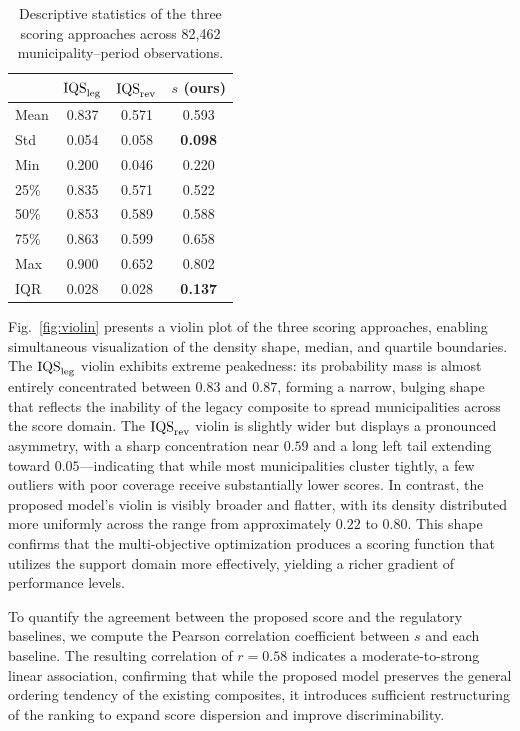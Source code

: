 \documentclass[english]{sbrt}
\begin{document}
\begin{table}[t]
    \centering
    \caption{Descriptive statistics of the three scoring approaches across 82{,}462 municipality--period observations.}
    \label{tab:descriptive}
    \begin{tabular}{l c c c}
        \toprule
         & $\mathrm{IQS}_\mathrm{leg}$ & $\mathrm{IQS}_\mathrm{rev}$ & $s$ (ours)\\
        \midrule
        Mean   & 0.837 & 0.571 & 0.593 \\
        Std    & 0.054 & 0.058 & \textbf{0.098} \\
        Min    & 0.200 & 0.046 & 0.220 \\
        25\%   & 0.835 & 0.571 & 0.522 \\
        50\%   & 0.853 & 0.589 & 0.588 \\
        75\%   & 0.863 & 0.599 & 0.658 \\
        Max    & 0.900 & 0.652 & 0.802 \\
        IQR    & 0.028 & 0.028 & \textbf{0.137} \\
        \bottomrule
    \end{tabular}
\end{table}

Fig.~\ref{fig:violin} presents a violin plot of the three scoring approaches, enabling simultaneous visualization of the density shape, median, and quartile boundaries. The $\mathrm{IQS}_\mathrm{leg}$ violin exhibits extreme peakedness: its probability mass is almost entirely concentrated between $0.83$ and $0.87$, forming a narrow, bulging shape that reflects the inability of the legacy composite to spread municipalities across the score domain. The $\mathrm{IQS}_\mathrm{rev}$ violin is slightly wider but displays a pronounced asymmetry, with a sharp concentration near $0.59$ and a long left tail extending toward $0.05$---indicating that while most municipalities cluster tightly, a few outliers with poor coverage receive substantially lower scores. In contrast, the proposed model's violin is visibly broader and flatter, with its density distributed more uniformly across the range from approximately $0.22$ to $0.80$. This shape confirms that the multi-objective optimization produces a scoring function that utilizes the support domain more effectively, yielding a richer gradient of performance levels.

To quantify the agreement between the proposed score and the regulatory baselines, we compute the Pearson correlation coefficient between $s$ and each baseline. The resulting correlation of $r = 0.58$ indicates a moderate-to-strong linear association, confirming that while the proposed model preserves the general ordering tendency of the existing composites, it introduces sufficient restructuring of the ranking to expand score dispersion and improve discriminability.
\end{document}

